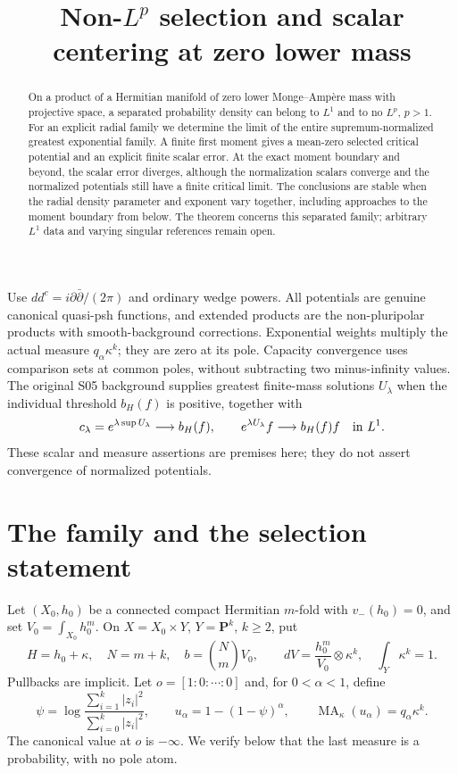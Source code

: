 \documentclass[11pt]{article}
\title{Non-$L^p$ selection and scalar centering at zero lower mass}
\author{}\date{}
\newcommand{\ddc}{dd^c}
\newcommand{\MA}{\operatorname{MA}}
\theoremstyle{remark}\newtheorem{remark}[theorem]{Remark}
\begin{document}
\maketitle
\begin{abstract}
On a product of a Hermitian manifold of zero lower Monge--Amp\`ere mass
with projective space, a separated probability density can belong to
$L^1$ and to no $L^p$, $p>1$. For an explicit radial family we determine
the limit of the entire supremum-normalized greatest exponential family.
A finite first moment gives a mean-zero selected critical potential and
an explicit finite scalar error. At the exact moment boundary and beyond,
the scalar error diverges, although the normalization scalars converge
and the normalized potentials still have a finite critical limit.
The conclusions are stable when the radial density parameter and exponent
vary together, including approaches to the moment boundary from below.
The theorem concerns this separated family; arbitrary $L^1$ data and
varying singular references remain open.
\end{abstract}

Use $\ddc=i\partial\bar\partial/(2\pi)$ and ordinary wedge powers.
All potentials are genuine canonical quasi-psh functions, and extended
products are the non-pluripolar products with smooth-background corrections.
Exponential weights multiply the actual measure $q_\alpha\kappa^k$;
they are zero at its pole. Capacity convergence uses comparison sets at
common poles, without subtracting two minus-infinity values.
The original S05 background supplies greatest finite-mass solutions
$U_\lambda$ when the individual threshold $b_H(f)$ is positive, together
with
\begin{equation}\label{eq:background}
 c_\lambda=e^{\lambda\sup U_\lambda}\longrightarrow b_H(f),
 \qquad e^{\lambda U_\lambda}f\longrightarrow b_H(f)f
 \quad\hbox{in }L^1.
\end{equation}
These scalar and measure assertions are premises here; they do not assert
convergence of normalized potentials.

\section{The family and the selection statement}
Let $(X_0,h_0)$ be a connected compact Hermitian $m$-fold with
$v_-(h_0)=0$, and set $V_0=\int_{X_0}h_0^m$. On
$X=X_0\times Y$, $Y=\mathbf P^k$, $k\geq2$, put
\[
 H=h_0+\kappa,\quad N=m+k,\quad b=\binom Nm V_0,\qquad
 dV=\frac{h_0^m}{V_0}\otimes\kappa^k,\quad\int_Y\kappa^k=1.
\]
Pullbacks are implicit. Let $o=[1:0:\cdots:0]$ and, for $0<\alpha<1$, define
\[
 \psi=\log\frac{\sum_{i=1}^k|z_i|^2}{\sum_{i=0}^k|z_i|^2},
 \qquad u_\alpha=1-(1-\psi)^\alpha,\qquad
 \MA_\kappa(u_\alpha)=q_\alpha\kappa^k.
\]
The canonical value at $o$ is $-\infty$. We verify below that the last
measure is a probability, with no pole atom.
\end{document}
